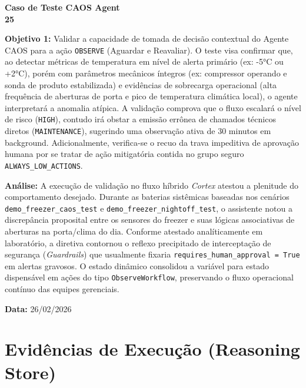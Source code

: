 \documentclass[11pt,a4paper]{article}
\begin{document}
\begin{center}
    \vspace*{1cm}
    {\Huge \textbf{\color{vivaBlue} Caso de Teste CAOS Agent}}\\[0.5cm]
    {\Huge \textbf{25}}\\[0.2cm]
\end{center}

\vspace{0.5cm}

\textbf{Objetivo 1:} Validar a capacidade de tomada de decisão contextual do Agente CAOS para a ação \texttt{OBSERVE} (Aguardar e Reavaliar). O teste visa confirmar que, ao detectar métricas de temperatura em nível de alerta primário (ex: -5°C ou +2°C), porém com parâmetros mecânicos íntegros (ex: compressor operando e sonda de produto estabilizada) e evidências de sobrecarga operacional (alta frequência de aberturas de porta e pico de temperatura climática local), o agente interpretará a anomalia atípica. A validação comprova que o fluxo escalará o nível de risco (\texttt{HIGH}), contudo irá obstar a emissão errônea de chamados técnicos diretos (\texttt{MAINTENANCE}), sugerindo uma observação ativa de 30 minutos em background. Adicionalmente, verifica-se o recuo da trava impeditiva de aprovação humana por se tratar de ação mitigatória contida no grupo seguro \texttt{ALWAYS\_LOW\_ACTIONS}.

\vspace{0.5cm}
\textbf{Análise:} A execução de validação no fluxo híbrido \textit{Cortex} atestou a plenitude do comportamento desejado. Durante as baterias sistêmicas baseadas nos cenários \texttt{demo\_freezer\_caos\_test} e \texttt{demo\_freezer\_nightoff\_test}, o assistente notou a discrepância proposital entre os sensores do freezer e suas lógicas associativas de aberturas na porta/clima do dia. Conforme atestado analíticamente em laboratório, a diretiva contornou o reflexo precipitado de interceptação de segurança (\textit{Guardrails}) que usualmente fixaria \texttt{requires\_human\_approval = True} em alertas gravosos. O estado dinâmico consolidou a variável para estado dispensável em ações do tipo \texttt{ObserveWorkflow}, preservando o fluxo operacional contínuo das equipes gerenciais.

\vspace{0.5cm}
\textbf{Data:} 26/02/2026

\vspace{1cm}

\section*{Evidências de Execução (Reasoning Store)}
\end{document}
